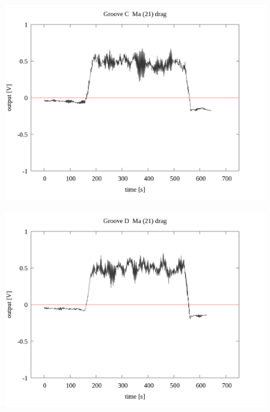 \documentclass[a4paper]{jsarticle}
\begin{document}
\begin{figure}[htbp]
    \footnotesize
    \begin{center}
        \includegraphics[width=140mm]{../../../33_result/210806/moving_average/21/drag/Groove_C_ma(21)_drag.png}
    \end{center}
\end{figure}

\begin{figure}[htbp]
    \footnotesize
    \begin{center}
        \includegraphics[width=140mm]{../../../33_result/210806/moving_average/21/drag/Groove_D_ma(21)_drag.png}
    \end{center}
\end{figure}
\end{document}

